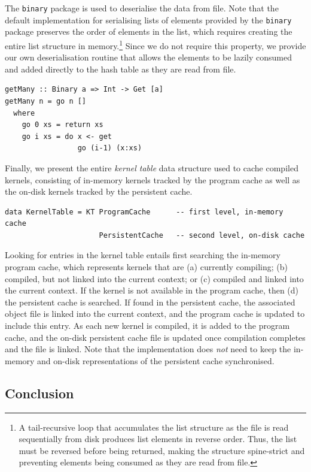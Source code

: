 The \texttt{binary} package is used to deserialise the data from file. Note that
the default implementation for serialising lists of elements provided by the
\texttt{binary} package preserves the order of elements in the list, which
requires creating the entire list structure in memory.\footnote{A tail-recursive
loop that accumulates the list structure as the file is read sequentially from
disk produces list elements in reverse order. Thus, the list must be reversed
before being returned, making the structure spine-strict and preventing elements
being consumed as they are read from file.} Since we do not require this
property, we provide our own deserialisation routine that allows the elements to
be lazily consumed and added directly to the hash table as they are read from
file.

\begin{lstlisting}[style=haskell]
getMany :: Binary a => Int -> Get [a]
getMany n = go n []
  where
    go 0 xs = return xs
    go i xs = do x <- get
                 go (i-1) (x:xs)
\end{lstlisting}

Finally, we present the entire \emph{kernel table} data structure used to cache
compiled kernels, consisting of in-memory kernels tracked by the program cache
as well as the on-disk kernels tracked by the persistent cache.

\begin{lstlisting}[style=haskell]
data KernelTable = KT ProgramCache      -- first level, in-memory cache
                      PersistentCache   -- second level, on-disk cache
\end{lstlisting}

Looking for entries in the kernel table entails first searching the in-memory
program cache, which represents kernels that are (a) currently compiling; (b)
compiled, but not linked into the current context; or (c) compiled and linked
into the current context. If the kernel is not available in the program cache,
then (d) the persistent cache is searched. If found in the persistent cache, the
associated object file is linked into the current context, and the program cache
is updated to include this entry. As each new kernel is compiled, it is added to
the program cache, and the on-disk persistent cache file is updated once
compilation completes and the file is linked. Note that the implementation does
\emph{not} need to keep the in-memory and on-disk representations of the
persistent cache synchronised.


\subsection{Conclusion}


